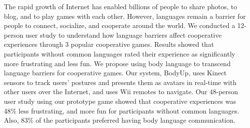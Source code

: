 
The rapid growth of Internet has enabled billions of people to share photos, to blog, and to play games with each other. However, languages remain a barrier for people to connect, socialize, and cooperate around the world. 
We conducted a 12-person user study to understand how language barriers affect cooperative experiences through 3 popular cooperative games. Results showed that participants without common languages rated their experience as significantly more frustrating and less fun. We propose using body language to transcend language barriers for cooperative games. Our system, BodyUp, uses Kinect sensors to track users' postures and presents them as avatars in real-time with other users over the Internet, and uses Wii remotes to navigate.  Our 48-person user study using our prototype game showed that cooperative experiences was 48\% less frustrating, and more fun for participants without common languages. Also, 83\% of the participants preferred having body language communication. 

%
